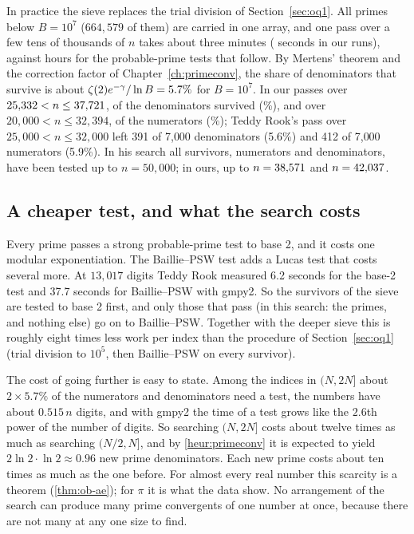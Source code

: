 In practice the sieve replaces the trial division of Section~\ref{sec:oq1}. All primes below $B = 10^7$ ($664{,}579$ of them) are carried in one array, and one pass over a few tens of thousands of $n$ takes about three minutes (\TwSieveSec{} seconds in our runs), against hours for the probable-prime tests that follow. By Mertens' theorem and the correction factor of Chapter~\ref{ch:primeconv}, the share of denominators that survive is about $\zeta(2)e^{-\gamma}/\ln B = 5.7\%$ for $B = 10^7$. In our passes over $25{,}332 < n \le 37{,}721$, \FoSieveQSurv{} of the \FoSieveQCand{} denominators survived (\FoSieveQPct\%), and over $20{,}000 < n \le 32{,}394$, \TwSievePSurv{} of the \TwSievePCand{} numerators (\TwSievePPct\%); Teddy Rook's pass over $25{,}000 < n \le 32{,}000$ left 391 of 7{,}000 denominators (5.6\%) and 412 of 7{,}000 numerators (5.9\%). In his search all survivors, numerators and denominators, have been tested up to $n = 50{,}000$; in ours, up to $n = 38{,}571$ and $n = 42{,}037$.

\subsection{A cheaper test, and what the search costs}

Every prime passes a strong probable-prime test to base 2, and it costs one modular exponentiation. The Baillie--PSW test adds a Lucas test that costs several more. At $13{,}017$ digits Teddy Rook measured 6.2 seconds for the base-2 test and 37.7 seconds for Baillie--PSW with gmpy2. So the survivors of the sieve are tested to base 2 first, and only those that pass (in this search: the primes, and nothing else) go on to Baillie--PSW. Together with the deeper sieve this is roughly eight times less work per index than the procedure of Section~\ref{sec:oq1} (trial division to $10^5$, then Baillie--PSW on every survivor).

The cost of going further is easy to state. Among the indices in $(N, 2N]$ about $2\times5.7\%$ of the numerators and denominators need a test, the numbers have about $0.515\,n$ digits, and with gmpy2 the time of a test grows like the $2.6$th power of the number of digits. So searching $(N, 2N]$ costs about twelve times as much as searching $(N/2, N]$, and by \cref{heur:primeconv} it is expected to yield $2\ln 2\cdot\ln 2 \approx 0.96$ new prime denominators. Each new prime costs about ten times as much as the one before. For almost every real number this scarcity is a theorem (\cref{thm:ob-ae}); for $\pi$ it is what the data show. No arrangement of the search can produce many prime convergents of one number at once, because there are not many at any one size to find.


